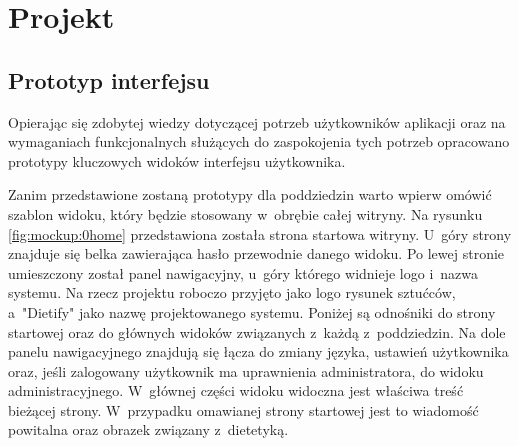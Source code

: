\chapter{Projekt}\label{ch:project}

%
%
%
%
%
%

\section{Prototyp interfejsu}\label{sec:mockups}

Opierając się zdobytej wiedzy dotyczącej potrzeb użytkowników aplikacji
oraz na wymaganiach funkcjonalnych służących do zaspokojenia tych potrzeb
opracowano prototypy kluczowych widoków interfejsu użytkownika.
\par
Zanim przedstawione zostaną prototypy dla poddziedzin warto wpierw omówić szablon widoku, który będzie stosowany w~obrębie całej witryny.
Na rysunku \ref{fig:mockup:0home} przedstawiona została strona startowa witryny.
U~góry strony znajduje się belka zawierająca hasło przewodnie danego widoku.
Po lewej stronie umieszczony został panel nawigacyjny, u~góry którego widnieje logo i~nazwa systemu.
Na rzecz projektu roboczo przyjęto jako logo rysunek sztućców, a~"Dietify" jako nazwę projektowanego systemu.
Poniżej są odnośniki do strony startowej oraz do głównych widoków związanych z~każdą z~poddziedzin.
Na dole panelu nawigacyjnego znajdują się łącza do zmiany języka, ustawień użytkownika oraz, jeśli zalogowany użytkownik ma uprawnienia administratora, do widoku administracyjnego.
W~głównej części widoku widoczna jest właściwa treść bieżącej strony.
W~przypadku omawianej strony startowej jest to wiadomość powitalna oraz obrazek związany z~dietetyką.

